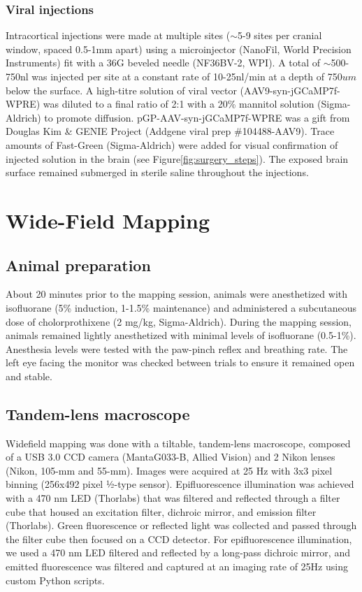 \subsubsection{Viral injections}
Intracortical injections were made at multiple sites ($\sim$5-9 sites per cranial window, spaced 0.5-1mm apart) using a microinjector (NanoFil, World Precision Instruments) fit with a 36G beveled needle (NF36BV-2, WPI). A total of $\sim$500-750nl was injected per site at a constant rate of 10-25nl/min at a depth of 750$um$ below the surface. A high-titre solution of viral vector (AAV9-syn-jGCaMP7f-WPRE) was diluted to a final ratio of 2:1 with a 20\% mannitol solution (Sigma-Aldrich) to promote diffusion. pGP-AAV-syn-jGCaMP7f-WPRE was a gift from Douglas Kim & GENIE Project (Addgene viral prep \#104488-AAV9). Trace amounts of Fast-Green (Sigma-Aldrich) were added for visual confirmation of injected solution in the brain (see Figure\ref{fig:surgery_steps}). The exposed brain surface remained submerged in sterile saline throughout the injections.

\section{Wide-Field Mapping}
\subsection{Animal preparation}
About 20 minutes prior to the mapping session, animals were anesthetized with isofluorane (5\% induction, 1-1.5\% maintenance) and administered a subcutaneous dose of cholorprothixene (2 mg/kg, Sigma-Aldrich). During the mapping session, animals remained lightly anesthetized with minimal levels of isofluorane (0.5-1\%). Anesthesia levels were tested with the paw-pinch reflex and breathing rate. The left eye facing the monitor was checked between trials to ensure it remained open and stable. 

\subsection{Tandem-lens macroscope}
Widefield mapping was done with a tiltable, tandem-lens macroscope\cite{Ratzlaff1991, Kalatsky2003}, composed of a USB 3.0 CCD camera (MantaG033-B, Allied Vision) and 2 Nikon lenses (Nikon, 105-mm and 55-mm). Images were acquired at 25 Hz with 3x3 pixel binning (256x492 pixel ½-type sensor). Epifluorescence illumination was achieved with a 470 nm LED (Thorlabs) that was filtered and reflected through a filter cube that housed an excitation filter, dichroic mirror, and emission filter (Thorlabs). Green fluorescence or reflected light was collected and passed through the filter cube then focused on a CCD detector. For epifluorescence illumination, we used a 470 nm LED filtered and reflected by a long-pass dichroic mirror, and emitted fluorescence was filtered and captured at an imaging rate of 25Hz using custom Python scripts.


